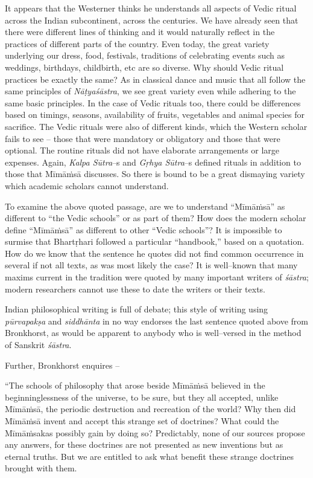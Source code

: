 It appears that the Westerner thinks he understands all aspects of Vedic ritual across the Indian subcontinent, across the centuries. We have already seen that there were different lines of thinking and it would naturally reflect in the practices of different parts of the country. Even today, the great variety underlying our dress, food, festivals, traditions of celebrating events such as weddings, birthdays, childbirth, etc are so diverse. Why should Vedic ritual practices be exactly the same? As in classical dance and music that all follow the same principles of \textit{Nāṭyaśāstra}, we see great variety even while adhering to the same basic principles. In the case of Vedic rituals too, there could be differences based on timings, seasons, availability of fruits, vegetables and animal species for sacrifice. The Vedic rituals were also of different kinds, which the Western scholar fails to see – those that were mandatory or obligatory and those that were optional. The routine rituals did not have elaborate arrangements or large expenses. Again, \textit{Kalpa Sūtra}–s and \textit{Gṛhya Sūtra}–s defined rituals in addition to those that Mīmāṁsā discusses. So there is bound to be a great dismaying variety which academic scholars cannot understand.

To examine the above quoted passage, are we to understand “Mīmāṁsā” as different to “the Vedic schools” or as part of them? How does the modern scholar define “Mīmāṁsā” as different to other “Vedic schools”? It is impossible to surmise that Bhartṛhari followed a particular “handbook,” based on a quotation. How do we know that the sentence he quotes did not find common occurrence in several if not all texts, as was most likely the case? It is well–known that many maxims current in the tradition were quoted by many important writers of \textit{śāstra}; modern researchers cannot use these to date the writers or their texts.

Indian philosophical writing is full of debate; this style of writing using \textit{pūrvapakṣa} and \textit{siddhānta} in no way endorses the last sentence quoted above from Bronkhorst, as would be apparent to anybody who is well–versed in the method of Sanskrit \textit{śāstra}.

Further, Bronkhorst enquires –

\begin{myquote}
“The schools of philosophy that arose beside Mīmāṁsā believed in the beginninglessness of the universe, to be sure, but they all accepted, unlike Mīmāṁsā, the periodic destruction and recreation of the world? Why then did Mīmāṁsā invent and accept this strange set of doctrines? What could the Mīmāṁsakas possibly gain by doing so? Predictably, none of our sources propose any answers, for these doctrines are not presented as new inventions but as eternal truths. But we are entitled to ask what benefit these strange doctrines brought with them.
\end{myquote}

